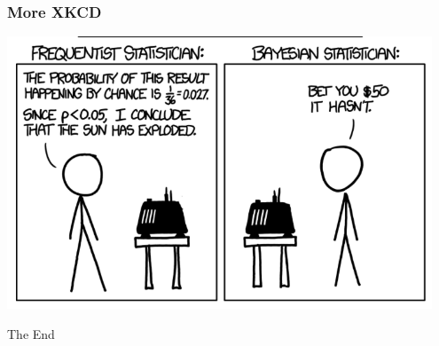 \documentclass[14pt,handout]{beamer}
\begin{document}
\begin{frame}
\frametitle{More XKCD}
	\begin{center}
	\includegraphics[width=0.95\textwidth]{images_20171130_xkcd2.png}
	\end{center}
\end{frame}

\begin{frame}
\Huge{\centerline{The End}}
\end{frame}

\end{document}
